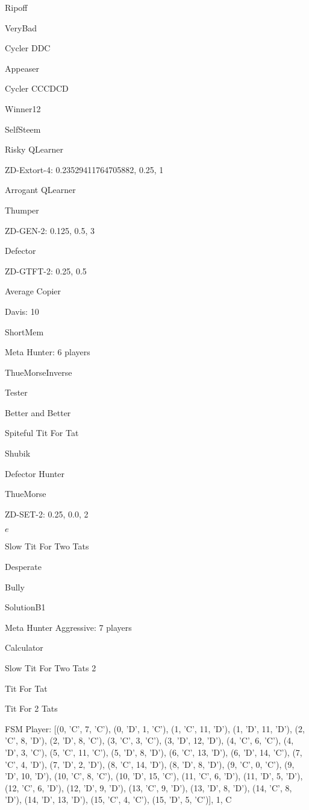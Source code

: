 \item Ripoff
\item VeryBad
\item Cycler DDC
\item Appeaser
\item Cycler CCCDCD
\item Winner12
\item SelfSteem
\item Risky QLearner
\item ZD-Extort-4: 0.23529411764705882, 0.25, 1
\item Arrogant QLearner
\item Thumper
\item ZD-GEN-2: 0.125, 0.5, 3
\item Defector
\item ZD-GTFT-2: 0.25, 0.5
\item Average Copier
\item Davis: 10
\item ShortMem
\item Meta Hunter: 6 players
\item ThueMorseInverse
\item Tester
\item Better and Better
\item Spiteful Tit For Tat
\item Shubik
\item Defector Hunter
\item ThueMorse
\item ZD-SET-2: 0.25, 0.0, 2
\item $e$
\item Slow Tit For Two Tats
\item Desperate
\item Bully
\item SolutionB1
\item Meta Hunter Aggressive: 7 players
\item Calculator
\item Slow Tit For Two Tats 2
\item Tit For Tat
\item Tit For 2 Tats
\item FSM Player: [(0, 'C', 7, 'C'), (0, 'D', 1, 'C'), (1, 'C', 11, 'D'), (1, 'D', 11, 'D'), (2, 'C', 8, 'D'), (2, 'D', 8, 'C'), (3, 'C', 3, 'C'), (3, 'D', 12, 'D'), (4, 'C', 6, 'C'), (4, 'D', 3, 'C'), (5, 'C', 11, 'C'), (5, 'D', 8, 'D'), (6, 'C', 13, 'D'), (6, 'D', 14, 'C'), (7, 'C', 4, 'D'), (7, 'D', 2, 'D'), (8, 'C', 14, 'D'), (8, 'D', 8, 'D'), (9, 'C', 0, 'C'), (9, 'D', 10, 'D'), (10, 'C', 8, 'C'), (10, 'D', 15, 'C'), (11, 'C', 6, 'D'), (11, 'D', 5, 'D'), (12, 'C', 6, 'D'), (12, 'D', 9, 'D'), (13, 'C', 9, 'D'), (13, 'D', 8, 'D'), (14, 'C', 8, 'D'), (14, 'D', 13, 'D'), (15, 'C', 4, 'C'), (15, 'D', 5, 'C')], 1, C
